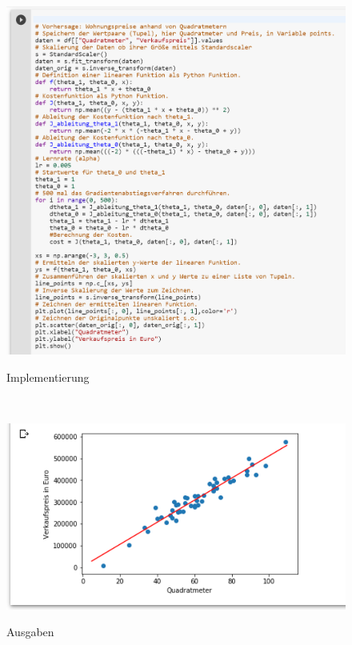 \documentclass[a4paper]{scrreprt}
\begin{document}
\begin{enumerate}
\begin{figure}[hp]
\includegraphics[scale=.75]{Abbildungen/Lineare_Regression_Python_4}
\label{Konvexe Funktion}
\caption{Implementierung}
\end{figure}\\
%
\begin{figure}[hp]
\centering
\includegraphics[scale=.75]{Abbildungen/Lineare_Regression_Python_5}
\label{Konvexe Funktion}
\caption{Ausgaben}
\end{figure}
\newpage

\end{enumerate}
\end{document}
